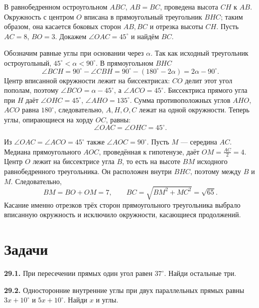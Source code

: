 \begin{example}\label{ex:review-ege-targeted-altitude-circle}
В равнобедренном остроугольном \(ABC\), \(AB=BC\), проведена высота \(CH\) к \(AB\). Окружность с центром \(O\) вписана в прямоугольный треугольник \(BHC\); таким образом, она касается боковых сторон \(AB,BC\) и отрезка высоты \(CH\). Пусть \(AC=8\), \(BO=3\). Докажем \(\angle OAC=45^\circ\) и найдём \(BC\).

Обозначим равные углы при основании через \(\alpha\). Так как исходный треугольник остроугольный, \(45^\circ<\alpha<90^\circ\). В прямоугольном \(BHC\)
\[
\angle BCH=90^\circ-\angle CBH
=90^\circ-(180^\circ-2\alpha)=2\alpha-90^\circ.
\]
Центр вписанной окружности лежит на биссектрисах: \(CO\) делит этот угол пополам, поэтому \(\angle BCO=\alpha-45^\circ\), а \(\angle ACO=45^\circ\). Биссектриса прямого угла при \(H\) даёт \(\angle OHC=45^\circ\), \(\angle AHO=135^\circ\). Сумма противоположных углов \(AHO\), \(ACO\) равна \(180^\circ\), следовательно, \(A,H,O,C\) лежат на одной окружности. Теперь углы, опирающиеся на хорду \(OC\), равны:
\[
\angle OAC=\angle OHC=45^\circ.
\]

Из \(\angle OAC=\angle ACO=45^\circ\) также \(\angle AOC=90^\circ\). Пусть \(M\) --- середина \(AC\). Медиана прямоугольного \(AOC\), проведённая к гипотенузе, даёт \(OM=\frac{AC}{2}=4\). Центр \(O\) лежит на биссектрисе угла \(B\), то есть на высоте \(BM\) исходного равнобедренного треугольника. Он расположен внутри \(BHC\), поэтому между \(B\) и \(M\). Следовательно,
\[
BM=BO+OM=7,\qquad
BC=\sqrt{BM^2+MC^2}=\sqrt{65}.
\]
Касание именно отрезков трёх сторон прямоугольного треугольника выбрало вписанную окружность и исключило окружности, касающиеся продолжений.
\end{example}
\section*{Задачи}
\begingroup\setlength{\parskip}{0pt}
\noindent\begin{minipage}[t]{\linewidth}\textbf{29.1.} При пересечении прямых один угол равен \(37^\circ\). Найди остальные три.\par\end{minipage}\par
\noindent\begin{minipage}[t]{\linewidth}\textbf{29.2.} Односторонние внутренние углы при двух параллельных прямых равны \(3x+10^\circ\) и \(5x+10^\circ\). Найди \(x\) и углы.\par\end{minipage}\par

